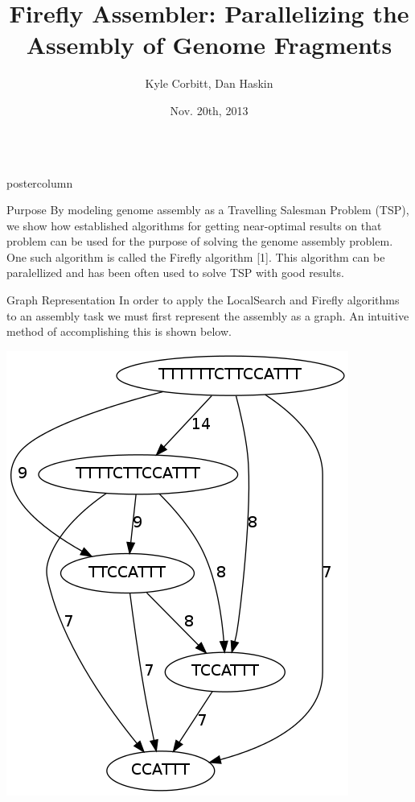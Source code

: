 \documentclass[final,hyperref={pdfpagelabels=false}]{beamer}
\title{\huge Firefly Assembler: Parallelizing the Assembly of Genome Fragments}
\author{Kyle Corbitt, Dan Haskin}
\institute[Brigham Young University]{Computer Science Department}
\date[Nov. 20th, 2013]{Nov. 20th, 2013}
\newlength{\columnheight}
\begin{document}
\begin{frame}
    \begin{columns}
        \begin{column}{.32\textwidth}
            \begin{beamercolorbox}[center,wd=\textwidth]{postercolumn}
                \begin{minipage}[T]{.95\textwidth}
                    \parbox[t][\columnheight]{\textwidth}{
                        \begin{block}{Purpose}
                            By modeling genome assembly as a Travelling
                            Salesman Problem (TSP), we show how established
                            algorithms for getting near-optimal results on that
                            problem can be used for the purpose of solving the
                            genome assembly problem. One such algorithm is called
                            the Firefly algorithm {[}1{]}.  This algorithm can
                            be paralellized and has been often used to solve
                            TSP with good results.
                        \end{block}
                        \begin{block}{Graph Representation}
                            In order to apply the LocalSearch and Firefly
                            algorithms to an assembly task we must first
                            represent the assembly as a graph.  An intuitive
                            method of accomplishing this is shown below.
                            \begin{center}
                                \includegraphics[scale=0.75]{example_graph}

\end{center}
\end{block}}
\end{minipage}
\end{beamercolorbox}
\end{column}
\end{columns}
\end{frame}
\end{document}
